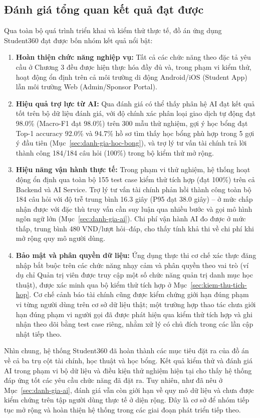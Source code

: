 \subsection{Đánh giá tổng quan kết quả đạt được}
Qua toàn bộ quá trình triển khai và kiểm thử thực tế, đồ án ứng dụng Student360 đạt được bốn nhóm kết quả nổi bật:
\begin{enumerate}
    \item \textbf{Hoàn thiện chức năng nghiệp vụ:} Tất cả các chức năng theo đặc tả yêu cầu ở Chương 3 đều được hiện thực hóa đầy đủ và, trong phạm vi kiểm thử, hoạt động ổn định trên cả môi trường di động Android/iOS (Student App) lẫn môi trường Web (Admin/Sponsor Portal).
    \item \textbf{Hiệu quả trợ lực từ AI:} Qua đánh giá có thể thấy phân hệ AI đạt kết quả tốt trên bộ dữ liệu đánh giá, với độ chính xác phân loại giao dịch tự động đạt 98.0\% (Macro-F1 đạt 98.0\%) trên 300 mẫu thử nghiệm, gợi ý học bổng đạt Top-1 accuracy 92.0\% và 94.7\% hồ sơ tìm thấy học bổng phù hợp trong 5 gợi ý đầu tiên (Mục~\ref{sec:danh-gia-hoc-bong}), và trợ lý tư vấn tài chính trả lời thành công 184/184 câu hỏi (100\%) trong bộ kiểm thử mở rộng.

    \item \textbf{Hiệu năng vận hành thực tế:} Trong phạm vi thử nghiệm, hệ thống hoạt động ổn định qua toàn bộ 155 test case kiểm thử tích hợp (đạt 100\%) trên cả Backend và AI Service. Trợ lý tư vấn tài chính phản hồi thành công toàn bộ 184 câu hỏi với độ trễ trung bình 16.3 giây (P95 đạt 38.0 giây) -- ở mức chấp nhận được với đặc thù truy vấn cần suy luận qua nhiều bước và gọi mô hình ngôn ngữ lớn (Mục~\ref{sec:danh-gia-ai}). Chi phí vận hành AI đo được ở mức thấp, trung bình 480 VND/lượt hỏi--đáp, cho thấy tính khả thi về chi phí khi mở rộng quy mô người dùng.
    \item \textbf{Bảo mật và phân quyền dữ liệu:} Ứng dụng thực thi cơ chế xác thực đăng nhập bắt buộc trên các chức năng nhạy cảm và phân quyền theo vai trò (ví dụ chỉ Quản trị viên được truy cập một số chức năng quản trị danh mục học thuật), được xác minh qua bộ kiểm thử tích hợp ở Mục~\ref{sec:kiem-thu-tich-hop}. Cơ chế cảnh báo tài chính cũng được kiểm chứng giới hạn đúng phạm vi từng người dùng trên cơ sở dữ liệu thật; một trường hợp thao tác chưa giới hạn đúng phạm vi người gọi đã được phát hiện qua kiểm thử tích hợp và ghi nhận theo dõi bằng test case riêng, nhằm xử lý có chủ đích trong các lần cập nhật tiếp theo.
\end{enumerate}

Nhìn chung, hệ thống Student360 đã hoàn thành các mục tiêu đặt ra của đồ án về cả ba trụ cột tài chính, học thuật và học bổng. Kết quả kiểm thử và đánh giá AI trong phạm vi bộ dữ liệu và điều kiện thử nghiệm hiện tại cho thấy hệ thống đáp ứng tốt các yêu cầu chức năng đã đặt ra. Tuy nhiên, như đã nêu ở Mục~\ref{sec:danh-gia-ai}, đánh giá vẫn còn giới hạn về quy mô dữ liệu và chưa được kiểm chứng trên tập người dùng thực tế ở diện rộng. Đây là cơ sở để nhóm tiếp tục mở rộng và hoàn thiện hệ thống trong các giai đoạn phát triển tiếp theo.
